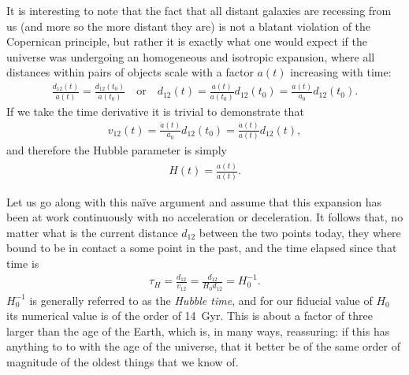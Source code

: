 It is interesting to note that the fact that all distant galaxies are recessing
from us (and more so the more distant they are) is not a blatant violation of the
Copernican principle, but rather it is exactly what one would
expect if the universe was undergoing an homogeneous and isotropic expansion, where
all distances within pairs of objects scale with a factor $a(t)$ increasing with time:
\begin{align*}
  \frac{d_{12}(t)}{a(t)} = \frac{d_{12}(t_0)}{a(t_0)} \quad\text{or}\quad
	d_{12}(t) = \frac{a(t)}{a(t_0)} d_{12}(t_0) = \frac{a(t)}{a_0} d_{12}(t_0).
\end{align*}
If we take the time derivative it is trivial to demonstrate that
\begin{align*}
	v_{12}(t) = \frac{\dot{a}(t)}{a_0} d_{12}(t_0) = \frac{\dot{a}(t)}{a(t)} d_{12}(t),
\end{align*}
and therefore the Hubble parameter is simply
\begin{align}
	H(t) = \frac{\dot{a(t)}}{a(t)}.
\end{align}

Let us go along with this na\"ive argument and assume that this expansion has been
at work continuously with no acceleration or deceleration. It follows that, no matter
what is the current distance $d_{12}$ between the two points today, they where bound
to be in contact a some point in the past, and the time elapsed since that time is
\begin{align*}
	\tau_H = \frac{d_{12}}{v_{12}} = \frac{d_{12}}{H_0 d_{12}} = H_0^{-1}.
\end{align*}
$H_0^{-1}$ is generally referred to as the \emph{Hubble time}, and for our fiducial
value of $H_0$ its numerical value is of the order of 14~Gyr. This is about a factor
of three larger than the age of the Earth, which is, in many ways, reassuring: if
this has anything to to with the age of the universe, that it better be of the same
order of magnitude of the oldest things that we know of.

